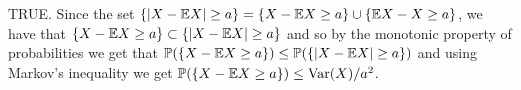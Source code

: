 TRUE. Since the set $ \{ |X - \mathbb{E} X| \geq a \} = \{ X - \mathbb{E} X \geq a \} \cup \{ \mathbb{E} X - X \geq a \} $,
we have that $ \{ X - \mathbb{E} X \geq a \} \subset \{ |X - \mathbb{E} X | \geq a\} $ and so by the monotonic
property of probabilities we get that $ \mathbb P( \{ X - \mathbb{E} X \geq a \} ) \leq \mathbb P( \{ |X- \mathbb{E} X| \geq a\}
)$ and using Markov's inequality we get $ \mathbb P( \{ X - \mathbb{E} X \geq a \} ) \leq \mathrm{Var}(X)/a^2$.

